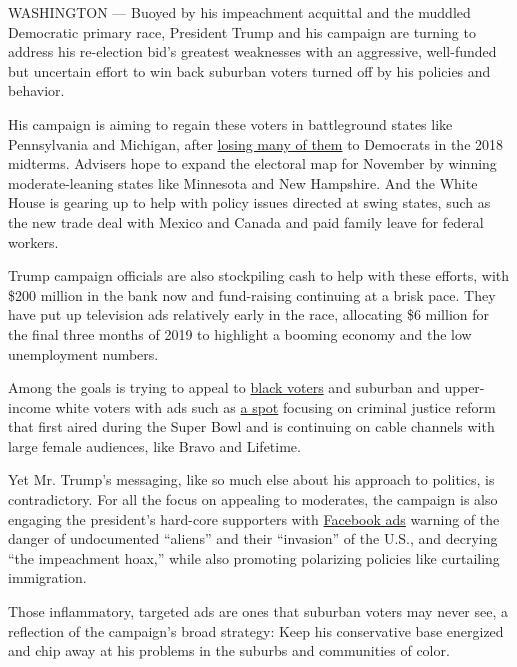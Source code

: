 WASHINGTON --- Buoyed by his impeachment acquittal and the muddled
Democratic primary race, President Trump and his campaign are turning to
address his re-election bid's greatest weaknesses with an aggressive,
well-funded but uncertain effort to win back suburban voters turned off
by his policies and behavior.

His campaign is aiming to regain these voters in battleground states
like Pennsylvania and Michigan, after
\href{https://www.nytimes.com/2018/11/01/us/politics/republicans-trump-house.html}{losing
many of them} to Democrats in the 2018 midterms. Advisers hope to expand
the electoral map for November by winning moderate-leaning states like
Minnesota and New Hampshire. And the White House is gearing up to help
with policy issues directed at swing states, such as the new trade deal
with Mexico and Canada and paid family leave for federal workers.

Trump campaign officials are also stockpiling cash to help with these
efforts, with \$200 million in the bank now and fund-raising continuing
at a brisk pace. They have put up television ads relatively early in the
race, allocating \$6 million for the final three months of 2019 to
highlight a booming economy and the low unemployment numbers.

Among the goals is trying to appeal to
\href{https://www.nytimes.com/2020/02/04/us/politics/trump-super-bowl-ad.html}{black
voters} and suburban and upper-income white voters with ads such as
\href{https://www.nytimes.com/2018/06/06/us/politics/trump-alice-johnson-sentence-commuted-kim-kardashian-west.html}{a
spot} focusing on criminal justice reform that first aired during the
Super Bowl and is continuing on cable channels with large female
audiences, like Bravo and Lifetime.

Yet Mr. Trump's messaging, like so much else about his approach to
politics, is contradictory. For all the focus on appealing to moderates,
the campaign is also engaging the president's hard-core supporters with
\href{https://www.nytimes.com/2019/10/20/us/elections/trump-campaign-ads-democrats.html}{Facebook
ads} warning of the danger of undocumented ``aliens'' and their
``invasion'' of the U.S., and decrying ``the impeachment hoax,'' while
also promoting polarizing policies like curtailing immigration.

Those inflammatory, targeted ads are ones that suburban voters may never
see, a reflection of the campaign's broad strategy: Keep his
conservative base energized and chip away at his problems in the suburbs
and communities of color.

